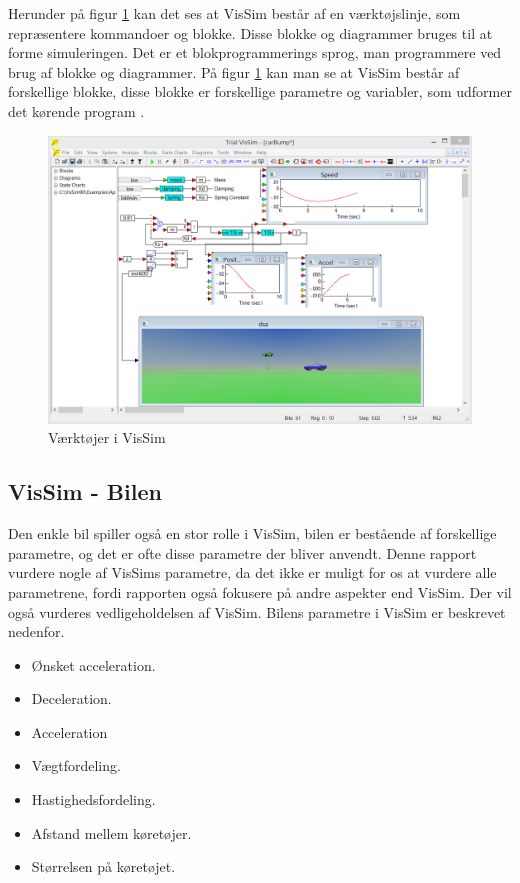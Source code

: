 \vspace{5mm}

Herunder på figur \ref{vissim} kan det ses at VisSim består af en værktøjslinje, som repræsentere kommandoer og blokke. Disse blokke og diagrammer bruges til at forme simuleringen. Det er et blokprogrammerings sprog, man programmere ved brug af blokke og diagrammer. På figur \ref{vissim} kan man se at VisSim består af forskellige blokke, disse blokke er forskellige parametre og variabler, som udformer det kørende program \cite{vissimfunker}.

\begin{figure}[H]
\begin{center}
\includegraphics[width=\textwidth]{Pictures/Teknologianalyse/vissimfunker}
\end{center}
\caption{Værktøjer i VisSim}
\label{vissim}
\end{figure}

\subsection*{VisSim - Bilen}
Den enkle bil spiller også en stor rolle i VisSim, bilen er bestående af forskellige parametre, og det er ofte disse parametre der bliver anvendt. Denne rapport vurdere nogle af VisSims parametre, da det ikke er muligt for os at vurdere alle parametrene, fordi rapporten også fokusere på andre aspekter end VisSim. Der vil også vurderes vedligeholdelsen af VisSim. Bilens parametre i VisSim er beskrevet nedenfor.\cite{TrafiksimuleringVisSim}

\begin{itemize}
\item Ønsket acceleration.
\item Deceleration.
\item Acceleration
\item Vægtfordeling.
\item Hastighedsfordeling.
\item Afstand mellem køretøjer.
\item Størrelsen på køretøjet.
\end{itemize}

